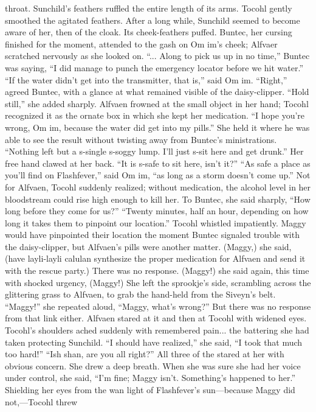 \documentclass[9pt]{article}
\begin{document}
throat. Sunchild’s feathers ruffled the entire length of its arms. Tocohl gently smoothed the agitated
feathers. After a long while, Sunchild seemed to become aware of her, then of the cloak. Its
cheek-feathers puffed.
Buntec, her cursing finished for the moment, attended to the gash on Om im’s cheek; Alfvaer
scratched nervously as she looked on. “... Along to pick us up in no time,” Buntec was saying, “I did
manage to punch the emergency locator before we hit water.”
“If the water didn’t get into the transmitter, that is,” said Om im.
“Right,” agreed Buntec, with a glance at what remained visible of the daisy-clipper. “Hold still,” she
added sharply.
Alfvaen frowned at the small object in her hand; Tocohl recognized it as the ornate box in which she
kept her medication. “I hope you’re wrong, Om im, because the water did get into my pills.” She held it
where he was able to see the result without twisting away from Buntec’s ministrations. “Nothing left but a
s-single s-soggy lump. I’ll just s-sit here and get drunk.” Her free hand clawed at her back. “It is s-safe
to sit here, isn’t it?”
“As safe a place as you’ll find on Flashfever,” said Om im, “as long as a storm doesn’t come up.”
Not for Alfvaen, Tocohl suddenly realized; without medication, the alcohol level in her bloodstream
could rise high enough to kill her. To Buntec, she said sharply, “How long before they come for us?”
“Twenty minutes, half an hour, depending on how long it takes them to pinpoint our location.”
Tocohl whistled impatiently. Maggy would have pinpointed their location the moment Buntec signaled
trouble with the daisy-clipper, but Alfvaen’s pills were another matter. (Maggy,) she said, (have
layli-layli calulan synthesize the proper medication for Alfvaen and send it with the rescue party.)
There was no response.
(Maggy!) she said again, this time with shocked urgency, (Maggy!) She left the sprookje’s side,
scrambling across the glittering grass to Alfvaen, to grab the hand-held from the Siveyn’s belt. “Maggy!”
she repeated aloud, “Maggy, what’s wrong?”
But there was no response from that link either.
Alfvaen stared at it and then at Tocohl with widened eyes.
Tocohl’s shoulders ached suddenly with remembered pain... the battering she had taken protecting
Sunchild. “I should have realized,” she said, “I took that much too hard!”
“Ish shan, are you all right?” All three of the stared at her with obvious concern.
She drew a deep breath. When she was sure she had her voice under control, she said, “I’m fine;
Maggy isn’t. Something’s happened to her.”
Shielding her eyes from the wan light of Flashfever’s sun—because Maggy did not,—Tocohl threw
\end{document}
